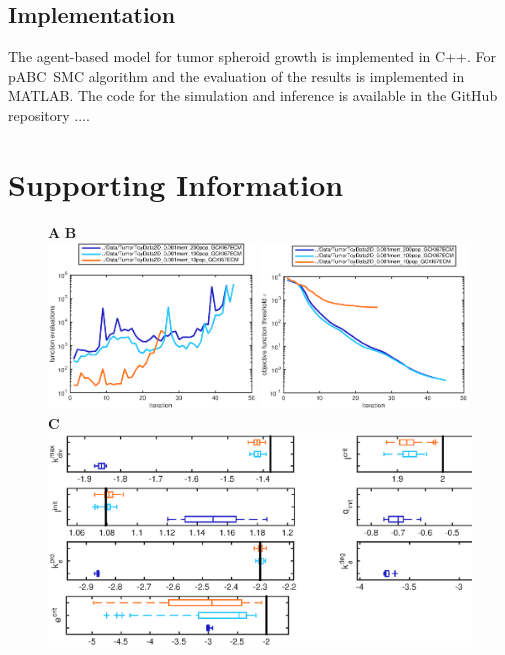 \documentclass[10pt,letterpaper]{article}
\newcommand{\jh}[1]{{\color{red}#1}}
\begin{document}
\subsection*{Implementation}
The agent-based model for tumor spheroid growth is implemented in C++. For pABC~SMC algorithm and the evaluation of the results is implemented in MATLAB. The code for the simulation and inference is available in the GitHub repository \jh{...}. 

\section*{Supporting Information}

\begin{figure}[p]
\textbf{A} \hspace{180pt} \textbf{B} \\
\includegraphics[width=0.49\textwidth]{Data/TumorToyData2D_0.001merr_XXX0pop_GCKI67ECMfunctionEvaluations}
\includegraphics[width=0.49\textwidth]{Data/TumorToyData2D_0.001merr_XXX0pop_GCKI67ECMobjectiveFunction}\\
 \textbf{C} \\
\includegraphics[width=\textwidth]{Data/TumorToyData2D_0.001merr_XXX0pop_GCKI67ECMindependentBoxplots}\\

\end{figure}
\end{document}
